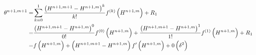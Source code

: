 \begin{align}
  \label{eq:celia_15}
  \theta^{n+1,m+1} = &\sum_{k=0}^1\frac{\del{ H^{n+1,m+1} - H^{n+1,m} }^k}{k!}f^{\del{ k }}\del{ H^{n+1,m} } + R_1 \\
  = &\frac{\del{ H^{n+1,m+1} - H^{n+1,m} }^0}{0!} f^{\del{ 0 }}\del{ H^{n+1,m} } + \frac{\del{ H^{n+1,m+1} - H^{n+1,m} }^1}{1!} f^{\del{ 1 }}\del{ H^{n+1,m} } + R_1 \\
                   = &f\del{ H^{n+1,m} } + \del{ H^{n+1,m+1} - H^{n+1,m} } f'\del{ H^{n+1,m} } + 0 \del{ \delta^2 }
\end{align}

